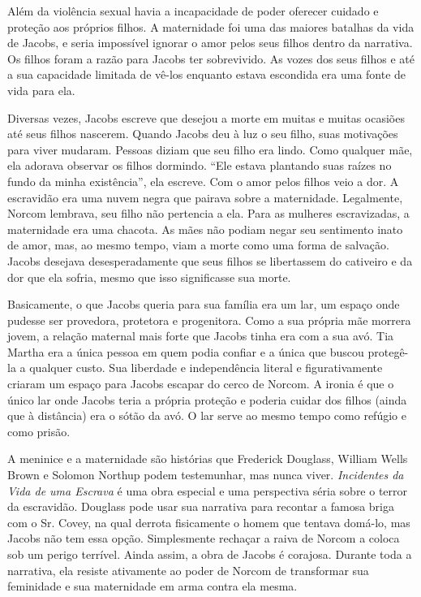 Além da violência sexual havia a incapacidade de poder oferecer cuidado
e proteção aos próprios filhos. A maternidade foi uma das maiores
batalhas da vida de Jacobs, e seria impossível ignorar o amor pelos seus
filhos dentro da narrativa. Os filhos foram a razão para Jacobs ter
sobrevivido. As vozes dos seus filhos e até a sua capacidade limitada de
vê-los enquanto estava escondida era uma fonte de vida para ela.

Diversas vezes, Jacobs escreve que desejou a morte em muitas e muitas
ocasiões até seus filhos nascerem. Quando Jacobs deu à luz o seu filho,
suas motivações para viver mudaram. Pessoas diziam que seu filho era
lindo. Como qualquer mãe, ela adorava observar os filhos dormindo. ``Ele
estava plantando suas raízes no fundo da minha existência'', ela
escreve. Com o amor pelos filhos veio a dor. A escravidão era uma nuvem
negra que pairava sobre a maternidade. Legalmente, Norcom lembrava, seu
filho não pertencia a ela. Para as mulheres escravizadas, a maternidade
era uma chacota. As mães não podiam negar seu sentimento inato de amor,
mas, ao mesmo tempo, viam a morte como uma forma de salvação. Jacobs
desejava desesperadamente que seus filhos se libertassem do cativeiro e
da dor que ela sofria, mesmo que isso significasse sua morte.

Basicamente, o que Jacobs queria para sua família era um lar, um espaço
onde pudesse ser provedora, protetora e progenitora. Como a sua própria
mãe morrera jovem, a relação maternal mais forte que Jacobs tinha era
com a sua avó. Tia Martha era a única pessoa em quem podia confiar e a
única que buscou protegê-la a qualquer custo. Sua liberdade e
independência literal e figurativamente criaram um espaço para Jacobs
escapar do cerco de Norcom. A ironia é que o único lar onde Jacobs teria
a própria proteção e poderia cuidar dos filhos (ainda que à distância)
era o sótão da avó. O lar serve ao mesmo tempo como refúgio e como
prisão.

A meninice e a maternidade são histórias que Frederick Douglass, William
Wells Brown e Solomon Northup podem testemunhar, mas nunca viver.
\emph{Incidentes da Vida de uma Escrava} é uma obra especial e uma
perspectiva séria sobre o terror da escravidão. Douglass pode usar sua
narrativa para recontar a famosa briga com o Sr. Covey, na qual derrota
fisicamente o homem que tentava domá-lo, mas Jacobs não tem essa opção.
Simplesmente rechaçar a raiva de Norcom a coloca sob um perigo terrível.
Ainda assim, a obra de Jacobs é corajosa. Durante toda a narrativa, ela
resiste ativamente ao poder de Norcom de transformar sua feminidade e
sua maternidade em arma contra ela mesma.

